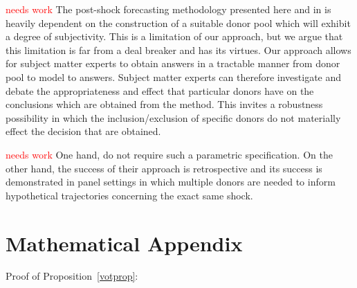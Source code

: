 \documentclass[11pt]{article}
\theoremstyle{definition}
\begin{document}
\textcolor{red}{needs work} The post-shock forecasting methodology presented here and in \cite{lin2021minimizing} is heavily dependent on the construction of a suitable donor pool which will exhibit a degree of subjectivity. This is a limitation of our approach, but we argue that this limitation is far from a deal breaker and has its virtues. Our approach allows for subject matter experts to obtain answers in a tractable manner from donor pool to model to answers. Subject matter experts can therefore investigate and debate the appropriateness and effect that particular donors have on the conclusions which are obtained from the method. This invites a robustness possibility in which the inclusion/exclusion of specific donors do not materially effect the decision that are obtained.

\textcolor{red}{needs work} One hand, \cite{agarwal2020two} do not require such a parametric specification. On the other hand, the success of their approach is retrospective and its success is demonstrated in panel settings in which multiple donors are needed to inform hypothetical trajectories concerning the exact same shock.





\section{Mathematical Appendix}


Proof of Proposition~\ref{votprop}:
\end{document}
